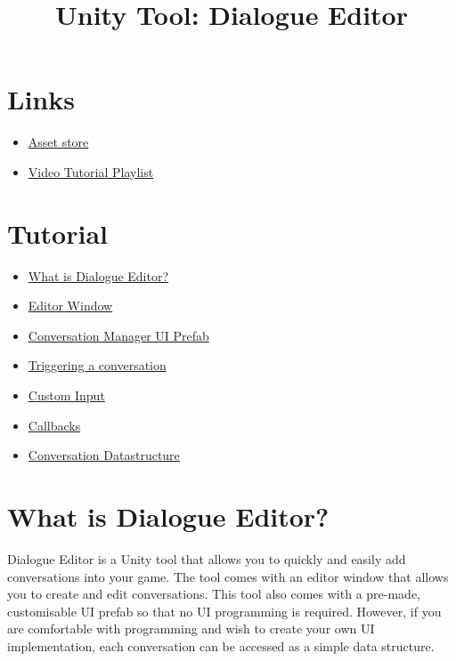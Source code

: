 \documentclass[a4paper,12pt]{article}
\begin{document}
\title{Unity Tool: Dialogue Editor}
\date{}
\maketitle


\section{Links}
\begin{itemize}
	\item \href{https://assetstore.unity.com/packages/tools/utilities/dialogue-editor-168329}{Asset store}
	\item \href{https://www.youtube.com/playlist?list=PLfRF6lnXtGqjrhzyQhidqMD-shMHGReXi}{Video Tutorial Playlist}
\end{itemize}


\section{Tutorial}
\begin{itemize}
	\item \hyperlink{_whatis}{What is Dialogue Editor?}
	\item \hyperlink{_editorwindow}{Editor Window}
	\item \hyperlink{_conversationmanager}{Conversation Manager UI Prefab}
	\item \hyperlink{_triggering}{Triggering a conversation}
	\item \hyperlink{_custominput}{Custom Input}
	\item \hyperlink{_callbacks}{Callbacks}
	\item \hyperlink{_datastructure}{Conversation Datastructure}
\end{itemize}

\newpage


\section{What is Dialogue Editor?}
\hypertarget{_whatis}{}
Dialogue Editor is a Unity tool that allows you to quickly and easily add conversations into your game.
\newline
The tool comes with an editor window that allows you to create and edit conversations.
\newline
This tool also comes with a pre-made, customisable UI prefab so that no UI programming is required. However, if you are comfortable with programming and wish to create your own UI implementation, each conversation can be accessed as a simple data structure.
\newpage
\end{document}

